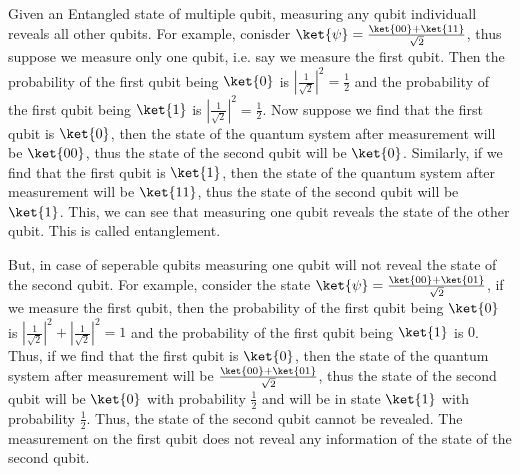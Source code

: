 \documentclass[12pt, oneside]{book}
\theoremstyle{definition}
\theoremstyle{definition}
\theoremstyle{remark}
\begin{document}
Given an Entangled state of multiple qubit, measuring any qubit individuall reveals all other qubits. 
For example, conisder $\ket{\psi}=\frac{\ket{00}+\ket{11}}{\sqrt{2}}$, thus suppose we measure only one qubit, i.e.
say we measure the first qubit. Then the probability of the first qubit being $\ket{0}$ is $|\frac{1}{\sqrt{2}}|^2=\frac{1}{2}$ and the probability of the first qubit being $\ket{1}$ is $|\frac{1}{\sqrt{2}}|^2=\frac{1}{2}$.
Now suppose we find that the first qubit is $\ket{0}$, then the state of the quantum system after measurement will be $\ket{00}$, thus the state of the second qubit will be $\ket{0}$.
Similarly, if we find that the first qubit is $\ket{1}$, then the state of the quantum system after measurement will be $\ket{11}$, thus the state of the second qubit will be $\ket{1}$.
This, we can see that measuring one qubit reveals the state of the other qubit. This is called entanglement.

But, in case of seperable qubits measuring one qubit will not reveal the state of the second qubit. For example, consider the state $\ket{\psi}=\frac{\ket{00}+\ket{01}}{\sqrt{2}}$,
if we measure the first qubit, then the probability of the first qubit being $\ket{0}$ is $|\frac{1}{\sqrt{2}}|^2+|\frac{1}{\sqrt{2}}|^2=1$ and the probability of the first qubit being $\ket{1}$ is $0$.
Thus, if we find that the first qubit is $\ket{0}$, then the state of the quantum system after measurement will be $\frac{\ket{00}+\ket{01}}{\sqrt{2}}$, thus the state of the second qubit will be $\ket{0}$ with probability $\frac{1}{2}$ and 
will be in state $\ket{1}$ with probability $\frac{1}{2}$. Thus, the state of the second qubit cannot be revealed. The measurement on the first qubit does not reveal any information of the state of the second qubit. 
\end{document}
